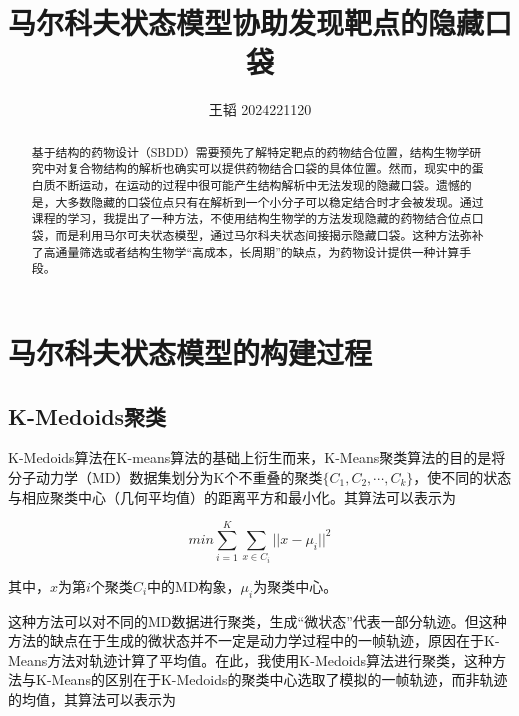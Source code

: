 \documentclass[a4paper]{article}
\title{马尔科夫状态模型协助发现靶点的隐藏口袋}                   %
\author{王韬 2024221120}
\begin{document}
	
\begin{CJK}{UTF8}{gbsn}
\maketitle

\begin{center}
\tableofcontents
\end{center}

 \begin{abstract}

基于结构的药物设计（SBDD）需要预先了解特定靶点的药物结合位置，结构生物学研究中对复合物结构的解析也确实可以提供药物结合口袋的具体位置。然而，现实中的蛋白质不断运动，在运动的过程中很可能产生结构解析中无法发现的隐藏口袋。遗憾的是，大多数隐藏的口袋位点只有在解析到一个小分子可以稳定结合时才会被发现。通过课程的学习，我提出了一种方法，不使用结构生物学的方法发现隐藏的药物结合位点口袋，而是利用马尔可夫状态模型，通过马尔科夫状态间接揭示隐藏口袋。这种方法弥补了高通量筛选或者结构生物学“高成本，长周期”的缺点，为药物设计提供一种计算手段。

 \end{abstract}
\newpage


\section{马尔科夫状态模型的构建过程}
	\subsection{K-Medoids聚类}

K-Medoids算法在K-means算法的基础上衍生而来，K-Means聚类算法的目的是将分子动力学（MD）数据集划分为K个不重叠的聚类$\{C_{1},C_{2}, \cdots,  C_{k}\}$，使不同的状态与相应聚类中心（几何平均值）的距离平方和最小化。其算法可以表示为

\begin{equation}
min\sum_{i=1}^{K}\sum_{x\in C_{i}}^{} {\vert\vert x- \mu_{i} \vert\vert}^{2}
\end{equation}

其中，$x$为第$i$个聚类$C_{i}$中的MD构象，$\mu_{i}$为聚类中心。


这种方法可以对不同的MD数据进行聚类，生成“微状态”代表一部分轨迹。但这种方法的缺点在于生成的微状态并不一定是动力学过程中的一帧轨迹，原因在于K-Means方法对轨迹计算了平均值。在此，我使用K-Medoids算法进行聚类，这种方法与K-Means的区别在于K-Medoids的聚类中心选取了模拟的一帧轨迹，而非轨迹的均值，其算法可以表示为


\end{CJK}
\end{document}
